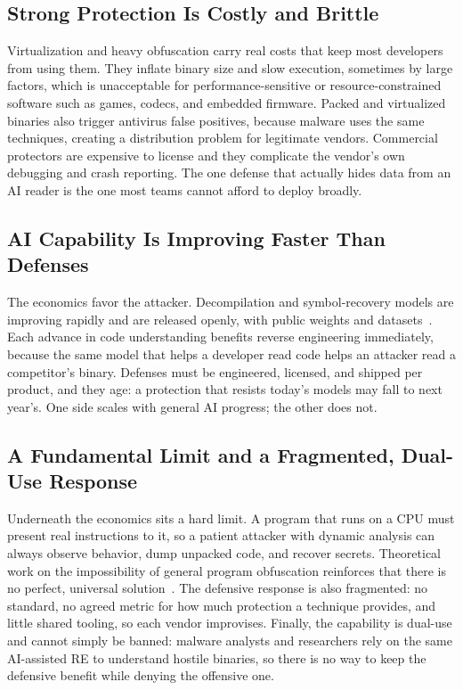 \documentclass[conference]{IEEEtran}
\begin{document}
\subsection{Strong Protection Is Costly and Brittle}
Virtualization and heavy obfuscation carry real costs that keep most developers from
using them. They inflate binary size and slow execution, sometimes by large factors,
which is unacceptable for performance-sensitive or resource-constrained software such
as games, codecs, and embedded firmware. Packed and virtualized binaries also trigger
antivirus false positives, because malware uses the same techniques, creating a
distribution problem for legitimate vendors. Commercial protectors are expensive to
license and they complicate the vendor's own debugging and crash reporting. The one
defense that actually hides data from an AI reader is the one most teams cannot
afford to deploy broadly.

\subsection{AI Capability Is Improving Faster Than Defenses}
The economics favor the attacker. Decompilation and symbol-recovery models are
improving rapidly and are released openly, with public weights and
datasets~\cite{llm4decompile,resym}. Each advance in code understanding benefits
reverse engineering immediately, because the same model that helps a developer read
code helps an attacker read a competitor's binary. Defenses must be engineered,
licensed, and shipped per product, and they age: a protection that resists today's
models may fall to next year's. One side scales with general AI progress; the other
does not.

\subsection{A Fundamental Limit and a Fragmented, Dual-Use Response}
Underneath the economics sits a hard limit. A program that runs on a CPU must present
real instructions to it, so a patient attacker with dynamic analysis can always
observe behavior, dump unpacked code, and recover secrets. Theoretical work on the
impossibility of general program obfuscation reinforces that there is no perfect,
universal solution~\cite{barak}. The defensive response is also fragmented: no
standard, no agreed metric for how much protection a technique provides, and little
shared tooling, so each vendor improvises. Finally, the capability is dual-use and
cannot simply be banned: malware analysts and researchers rely on the same
AI-assisted RE to understand hostile binaries, so there is no way to keep the
defensive benefit while denying the offensive one.
\end{document}
